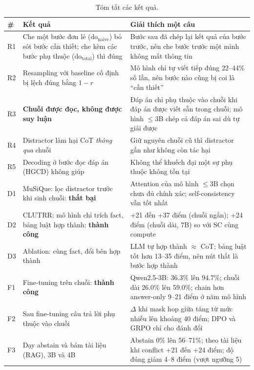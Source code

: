 \documentclass[11pt]{article}
\newcommand{\dn}{\mathrm{do}_{\text{naive}}}
\newcommand{\dt}{\mathrm{do}_{\text{total}}}
\begin{document}
\begin{table}[h]
\centering\small
\caption{Tóm tắt các kết quả.}
\label{tab:tomtat}
\begin{tabularx}{\linewidth}{@{}l>{\raggedright\arraybackslash}X>{\raggedright\arraybackslash}X@{}}
\toprule
\# & Kết quả & Giải thích một câu \\
\midrule
R1 & Che một bước đơn lẻ ($\dn$) bỏ sót bước cần thiết; che kèm các bước phụ thuộc ($\dt$) thì đúng
   & Bước sau đã chép lại kết quả của bước trước, nên che bước trước một mình không mất thông tin \\
R2 & Resampling với baseline cố định bị lệch đúng bằng $1-r$
   & Mô hình chỉ tự viết tiếp đúng 22--44\% số lần, nên bước nào cũng bị coi là ``cần thiết'' \\
R3 & \textbf{Chuỗi được đọc, không được suy luận}
   & Đáp án chỉ phụ thuộc vào chuỗi khi đáp án được viết sẵn trong chuỗi; mô hình $\le$3B chép cả
     đáp án sai dù tự giải được \\
R4 & Distractor làm hại CoT \emph{thông qua} chuỗi
   & Giữ nguyên chuỗi cũ thì distractor gần như không còn tác hại \\
R5 & Decoding ở bước đọc đáp án (HGCD) không giúp
   & Không thể khuếch đại một sự phụ thuộc không tồn tại \\
\midrule
D1 & MuSiQue: lọc distractor trước khi sinh chuỗi: \textcolor{doxam}{\textbf{thất bại}}
   & Attention của mô hình $\le$3B chọn chưa đủ chính xác; self-consistency vẫn tốt nhất \\
D2 & CLUTRR: mô hình chỉ trích fact, bảng luật hợp thành: \textcolor{luc}{\textbf{thành công}}
   & +21 đến +37 điểm (chuỗi ngắn); +24 điểm (chuỗi dài, 7B) so với SC cùng compute \\
D3 & Ablation: cùng fact, đổi bên hợp thành
   & LLM tự hợp thành $\approx$ CoT; bảng luật tốt hơn 13--35 điểm, nên nút thắt là bước hợp thành \\
\midrule
F1 & Fine-tuning trên chuỗi: \textcolor{luc}{\textbf{thành công}}
   & Qwen2.5-3B: 36.3\% lên 94.7\%; chuỗi dài 26.0\% lên 59.0\%; chain hơn answer-only 9--21 điểm ở năm mô hình \\
F2 & Sau fine-tuning câu trả lời phụ thuộc vào chuỗi
   & $\Delta$ khi mask hop giữa tăng từ mức nhiễu lên khoảng 40 điểm; DPO và GRPO chỉ cho đánh đổi \\
F3 & Dạy abstain và bám tài liệu (RAG), 3B và 4B
   & Abstain 0\% lên 56--71\%; theo tài liệu khi conflict +21 đến +24 điểm; độ đúng giảm 4--8 điểm (vượt ngưỡng 5) \\

\end{tabularx}
\end{table}
\end{document}
